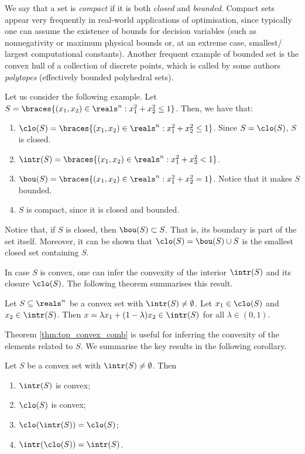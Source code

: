 We say that a set is \emph{compact} if it is both \emph{closed} and \emph{bounded}. Compact sets appear very frequently in real-world applications of optimisation, since typically one can assume the existence of bounds for decision variables (such as nonnegativity or maximum physical bounds or, at an extreme case, smallest/ largest computational constants). Another frequent example of bounded set is the convex hull of a collection of discrete points, which is called by some authors \emph{polytopes} (effectively bounded polyhedral sets).  

Let us consider the following example. Let $S = \braces{(x_1,x_2) \in \reals^n : x_1^2 + x_2^2 \leq 1}$. Then, we have that:
\begin{enumerate}
	\item $\clo(S) = \braces{(x_1,x_2) \in \reals^n : x_1^2 + x_2^2 \leq 1}$. Since $S = \clo(S)$, $S$ is closed.
	\item $\intr(S) = \braces{(x_1,x_2) \in \reals^n : x_1^2 + x_2^2 < 1}$. 
	\item $\bou(S) = \braces{(x_1,x_2) \in \reals^n : x_1^2 + x_2^2 = 1}$. Notice that it makes $S$ bounded.
	\item $S$ is compact, since it is closed and bounded. 
\end{enumerate}

Notice that, if $S$ is closed, then $\bou(S) \subset S$. That is, its boundary is part of the set itself. Moreover, it can be shown that $\clo(S) = \bou(S) \cup S$ is the smallest closed set containing $S$. 

In case $S$ is convex, one can infer the convexity of the interior $\intr(S)$ and its closure $\clo(S)$. The following theorem summarises this result.
%
\begin{theorem}\label{thm:top_convex_comb}
Let $S \subseteq \reals^n$ be a convex set with $\intr(S) \neq \emptyset$. Let $x_1 \in \clo(S)$ and $x_2 \in \intr(S)$. Then $x = \lambda x_1 + (1 - \lambda) x_2 \in \intr(S)$ for all $\lambda \in (0,1)$.
\end{theorem}
%


Theorem \ref{thm:top_convex_comb} is useful for inferring the convexity of the elements related to $S$. We summarise the key results in the following corollary.
%
\begin{corollary} Let $S$ be a convex set with $\intr(S) \neq \emptyset$. Then
	\begin{enumerate}
		\item $\intr(S)$ is convex;
		\item $\clo(S)$ is convex;
		\item $\clo(\intr(S)) = \clo(S)$;
		\item $\intr(\clo(S)) = \intr(S)$.
	\end{enumerate}
\end{corollary}
%

